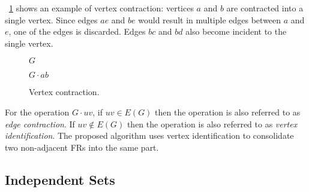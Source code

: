 \figurename~\ref{fig:contract} shows an example of vertex contraction: vertices \(a\) and \(b\) are contracted into
a single vertex.  Since edges \(ae\) and \(be\) would result in multiple edges between \(a\) and \(e\), one of the
edges is discarded.  Edges \(bc\) and \(bd\) also become incident to the single vertex.

\begin{figure}[H]
  \begin{minipage}{2.75in}
    \centering

    \bigskip

    \(G\)
  \end{minipage}
  \begin{minipage}{2.75in}
    \centering

    \bigskip

    \(G\cdot ab\)
  \end{minipage}
  \caption{Vertex contraction.}
  \label{fig:contract}
\end{figure}

For the operation \(G\cdot uv\), if \(uv\in E(G)\) then the operation is also referred to as \emph{edge
  contraction}.  If \(uv\notin E(G)\) then the operation is also referred to as \emph{vertex identification}.  The
proposed algorithm uses vertex identification to consolidate two non-adjacent FRs into the same part.

\subsection{Independent Sets}\label{sec:sub:independent}

